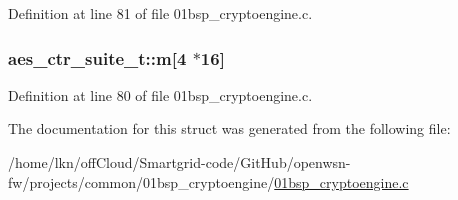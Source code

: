 Definition at line 81 of file 01bsp\+\_\+cryptoengine.\+c.

\subsubsection[{\texorpdfstring{m}{m}}]{ aes\+\_\+ctr\+\_\+suite\+\_\+t\+::m\mbox{[}4 $\ast$16\mbox{]}}\hypertarget{structaes__ctr__suite__t_a6195ae00084fb690584279fbd3e1a348}{}\label{structaes__ctr__suite__t_a6195ae00084fb690584279fbd3e1a348}


Definition at line 80 of file 01bsp\+\_\+cryptoengine.\+c.



The documentation for this struct was generated from the following file\+:\begin{DoxyCompactItemize}
\item 
/home/lkn/off\+Cloud/\+Smartgrid-\/code/\+Git\+Hub/openwsn-\/fw/projects/common/01bsp\+\_\+cryptoengine/\hyperlink{01bsp__cryptoengine_8c}{01bsp\+\_\+cryptoengine.\+c}\end{DoxyCompactItemize}

